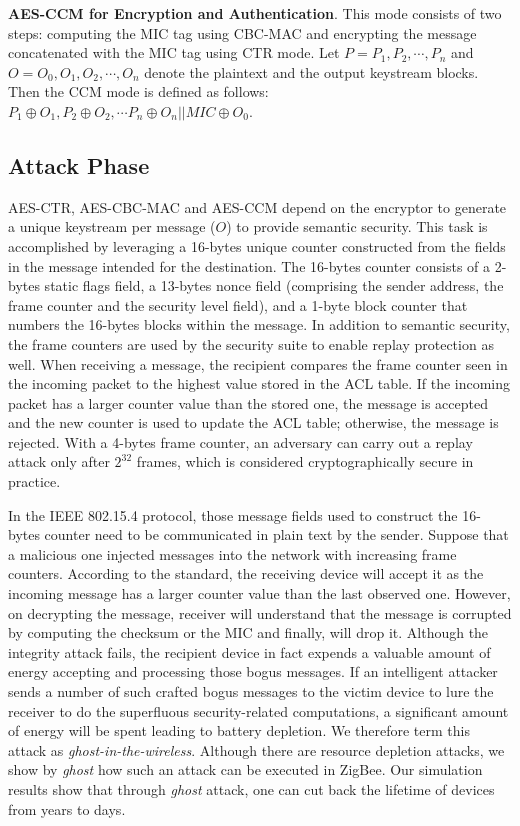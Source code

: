 \documentclass[10pt,journal,cspaper,compsoc]{IEEEtran}
\begin{document}
{\bf AES-CCM for Encryption and Authentication}.
This mode consists of two steps: computing the MIC tag using CBC-MAC and encrypting the message concatenated with the MIC tag using CTR mode. Let $P=P_1, P_2, \cdots, P_n$ and $O=O_0, O_1, O_2, \cdots, O_n$ denote the plaintext and the output keystream blocks. Then the CCM mode is defined as follows:  $P_1 \oplus O_1, P_2 \oplus O_2, \cdots P_n \oplus O_n || MIC \oplus O_0$.


\subsection{Attack Phase}
AES-CTR, AES-CBC-MAC and AES-CCM depend on the encryptor to generate a unique  keystream per message ($O$) to provide semantic security. This task is accomplished by leveraging a 16-bytes unique counter constructed from the fields in the message intended for the destination. The 16-bytes counter consists of a 2-bytes static flags field, a 13-bytes nonce field (comprising the sender address, the frame counter and the security level field), and a 1-byte block counter that numbers the 16-bytes blocks within the message. In addition to semantic security, the frame counters are used by the security suite to enable replay protection as well. When receiving a message, the recipient compares the frame counter seen in the incoming packet to the highest value stored in the ACL table. If the incoming packet has a larger counter value than the stored one, the message is accepted and the new counter is used to update the ACL table; otherwise, the message is rejected. With a 4-bytes frame counter, an adversary can carry out a replay attack only after $2^{32}$ frames, which is considered cryptographically secure in practice.

In the IEEE 802.15.4 protocol, those message fields used to construct the 16-bytes counter need to be communicated in plain text by the sender. Suppose that a malicious one injected messages into the network with increasing frame counters. According to the standard, the receiving device will accept it as the incoming message has a larger counter value than the last observed one. However, on decrypting the message, receiver will understand that the message is corrupted by computing the checksum or the MIC and finally, will drop it. Although the integrity attack fails, the recipient device in fact expends a valuable amount of energy accepting and processing those bogus messages.  If an intelligent attacker sends a number of such crafted bogus messages to the victim device to lure the receiver to do the superfluous security-related computations, a significant amount of energy will be spent leading to battery depletion. We therefore term this attack as {\em ghost-in-the-wireless}. Although there are resource depletion attacks, we show by {\em ghost} how such an attack can be executed in ZigBee. Our simulation results show that through {\em ghost} attack, one can cut back the lifetime of devices from years to days.
\end{document}
